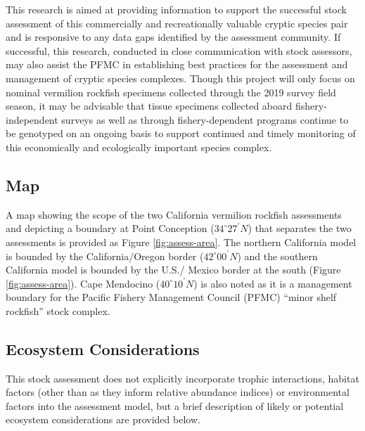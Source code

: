 \documentclass[
  english,
  a4paper,
]{article}
\begin{document}
This research is aimed at providing information to support the successful stock
assessment of this commercially and recreationally valuable cryptic species pair
and is responsive to any data gaps identified by the assessment community. If
successful, this research, conducted in close communication with stock assessors,
may also assist the PFMC in establishing best practices for the assessment and
management of cryptic species complexes. Though this project will only focus
on nominal vermilion rockfish specimens collected through the 2019 survey
field season, it may be advisable that tissue specimens collected aboard
fishery-independent surveys as well as through fishery-dependent programs
continue to be genotyped on an ongoing basis to support continued and timely
monitoring of this economically and ecologically important species complex.

\hypertarget{map}{%
\subsection{Map}\label{map}}

A map showing the scope of the two California vermilion rockfish assessments and depicting a
boundary
at Point Conception ($34^\circ 27^\prime N$) that separates the two assessments is provided as Figure \ref{fig:assess-area}. The northern California
model is bounded by the California/Oregon border ($42^\circ 00^\prime N$) and the southern California model is
bounded by the U.S./ Mexico border at the south (Figure \ref{fig:assess-area}).
Cape Mendocino ($40^\circ 10^\prime N$) is also noted as it is a management boundary for the
Pacific Fishery Management Council (PFMC) ``minor shelf rockfish'' stock complex.

\hypertarget{ecosystem-considerations}{%
\subsection{Ecosystem Considerations}\label{ecosystem-considerations}}

This stock assessment does not explicitly incorporate trophic interactions,
habitat factors (other than as they inform relative abundance indices) or environmental
factors into the assessment model, but a brief description of likely or potential
ecosystem considerations are provided below.
\end{document}
